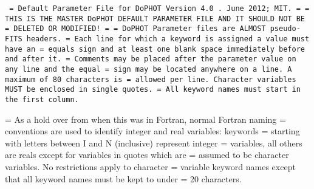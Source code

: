 {\obeylines \baselineskip=12pt \parindent=0pt
{\tt
=  Default Parameter File for DoPHOT Version 4.0 .      June 2012; MIT.
=
=  THIS IS THE MASTER DoPHOT DEFAULT PARAMETER FILE AND IT SHOULD NOT BE 
=  DELETED OR MODIFIED!
=
=  DoPHOT Parameter files are ALMOST pseudo-FITS headers.  
=  Each line for which a keyword is assigned a value must have an 
=  equals sign and at least one blank space immediately before and after it.  
=  Comments may be placed after the parameter value on any line and the equal 
=  sign may be located anywhere on a line.  A maximum of 80 characters is 
=  allowed per line.  Character variables MUST be enclosed in single quotes.  
=  All keyword names must start in the first column.  

=  As a hold over from when this was in Fortran, normal Fortran naming 
=  conventions are used to identify integer and real variables:  keywords 
=  starting with letters between I and N (inclusive) represent integer 
=  variables, all others are reals except for variables in quotes which are 
=  assumed to be character variables.  No restrictions apply to character 
=  variable keyword names except that all keyword names must be kept to under 
=  20 characters.  

}}
